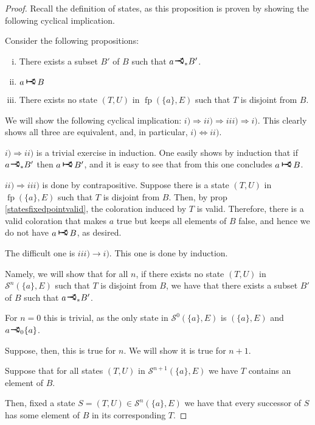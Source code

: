 \documentclass[11pt]{article}
\newcommand{\cS}{\mathcal{S}}
\DeclareMathOperator{\fp}{fp}
\newcommand{\rightcurveor}{
\!
\mathrel{
  \begin{tikzpicture}[scale=0.8]
    \draw[thick,->] (0,0) arc (90:150:-2ex);
    \draw[thick,->] (0,0) arc (90:30:2ex);
    \draw[thick] (-1ex, 0) -- (0.1ex,0);
  \end{tikzpicture}
}\!
}
\newcommand{\Rightcurveor}{
\mathrel{
  \begin{tikzpicture}[scale=0.8]
    \draw[thick,->] (0,0) arc (90:150:-2ex);
    \draw[thick,->] (0,0) arc (90:30:2ex);
    \draw[thick] (-1ex, 0) -- (0.1ex,0);
    \draw[thick] (-1ex, -0.7ex) -- (-1ex, 0.7ex);
  \end{tikzpicture}
}
}
\begin{document}
\begin{proof}
Recall the definition of states, as this proposition is proven by showing the following cyclical implication.

Consider the following propositions:

\begin{enumerate}[i)]
\item There exists a subset $B'$ of $B$ such that $a \rightcurveor_* B'$.
\item $a \Rightcurveor B$
\item There exists no state $(T,U)$ in $\fp (\{a\}, E)$ such that $T$ is disjoint from $B$.
\end{enumerate}

We will show the following cyclical implication: $i) \Rightarrow ii) \Rightarrow iii) \Rightarrow i)$. This clearly shows all three are equivalent, and, in particular, $i) \Leftrightarrow ii)$.

$i) \Rightarrow ii)$ is a trivial exercise in induction. One easily shows by induction that if $a \rightcurveor_* B'$ then $a \Rightcurveor B'$, and it is easy to see that from this one concludes $a \Rightcurveor B$.

$ii) \Rightarrow iii)$ is done by contrapositive. Suppose there is a state $(T, U)$ in $\fp (\{a\}, E)$ such that $T$ is disjoint from $B$. Then, by prop \ref{statesfixedpointvalid}, the coloration induced by $T$ is valid. Therefore, there is a valid coloration that makes $a$ true but keeps all elements of $B$ false, and hence we do not have $a \Rightcurveor B$, as desired.

The difficult one is $iii) \rightarrow i)$. This one is done by induction.

Namely, we will show that for all $n$, if there exists no state $(T,U)$ in $\cS^n (\{a\}, E)$ such that $T$ is disjoint from $B$, we have that there exists a subset $B'$ of $B$ such that $a \rightcurveor_* B'$.

For $n = 0$ this is trivial, as the only state in $\cS^0 (\{a\}, E)$ is $(\{a\}, E)$ and $a \rightcurveor_0 \{a\}$.

Suppose, then, this is true for $n$. We will show it is true for $n+1$.

Suppose that for all states $(T,U)$ in $\cS^{n+1} (\{a\}, E)$ we have $T$ contains an element of $B$.

Then, fixed a state $S = (T, U) \in \cS^n (\{a\}, E)$ we have that every successor of $S$ has some element of $B$ in its corresponding $T$.


\end{proof}
\end{document}
